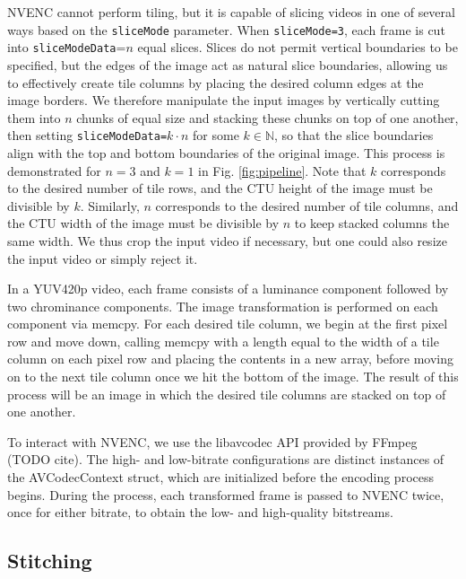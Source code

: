 NVENC cannot perform tiling, but it is capable of slicing videos in one of several ways based on the \texttt{sliceMode} parameter. When \texttt{sliceMode=3}, each frame is cut into \texttt{sliceModeData}=$n$ equal slices. Slices do not permit vertical boundaries to be specified, but the edges of the image act as natural slice boundaries, allowing us to effectively create tile columns by placing the desired column edges at the image borders. We therefore manipulate the input images by vertically cutting them into $n$ chunks of equal size and stacking these chunks on top of one another, then setting \texttt{sliceModeData=}$k \cdot n$ for some $k \in \mathbb{N}$, so that the slice boundaries align with the top and bottom boundaries of the original image. This process is demonstrated for $n=3$ and $k=1$ in Fig. \ref{fig:pipeline}. Note that $k$ corresponds to the desired number of tile rows, and the CTU height of the image must be divisible by $k$. Similarly, $n$ corresponds to the desired number of tile columns, and the CTU width of the image must be divisible by $n$ to keep stacked columns the same width. We thus crop the input video if necessary, but one could also resize the input video or simply reject it. 

In a YUV420p video, each frame consists of a luminance component followed by two chrominance components. The image transformation is performed on each component via memcpy. For each desired tile column, we begin at the first pixel row and move down, calling memcpy with a length equal to the width of a tile column on each pixel row and placing the contents in a new array, before moving on to the next tile column once we hit the bottom of the image. The result of this process will be an image in which the desired tile columns are stacked on top of one another.

To interact with NVENC, we use the libavcodec API provided by FFmpeg (TODO cite). The high- and low-bitrate configurations are distinct instances of the AVCodecContext struct, which are initialized before the encoding process begins. During the process, each transformed frame is passed to NVENC twice, once for either bitrate, to obtain the low- and high-quality bitstreams.

\subsection{Stitching}

